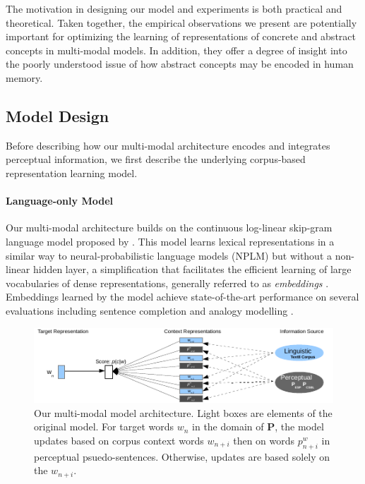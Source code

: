The motivation in designing our model and experiments is both practical and theoretical. Taken together, the empirical observations we present are potentially important for optimizing the learning of representations of concrete and abstract concepts in multi-modal models. In addition, they offer a degree of insight into the poorly understood issue of how abstract concepts may be encoded in human memory.    

\subsection{Model Design}

Before describing how our multi-modal architecture encodes and integrates perceptual information, we first describe the underlying corpus-based representation learning model. 

\paragraph{Language-only Model} Our multi-modal architecture builds on the continuous log-linear skip-gram language model proposed by \cite{mikolov2013efficient}. This model learns lexical representations in a similar way to neural-probabilistic language models (NPLM) but without a non-linear hidden layer, a simplification that facilitates the efficient learning of large vocabularies of dense representations, generally referred to as \emph{embeddings} \cite{turian2010word}. Embeddings learned by the model achieve state-of-the-art performance on several evaluations including sentence completion and analogy modelling \cite{mikolov2013efficient}.   

\begin{figure}[ht]  \includegraphics[width = \textwidth]{Chapter_3/Figure_1_EMNLP2014}  \caption{Our multi-modal model architecture. Light boxes are elements of the original \cite{mikolov2013efficient} model. For target words \(w_n\) in the domain of \(\mathbf{P}\), the model updates based on corpus context words \( w_{n+i} \) then on words \(p^w_{n+i}\) in perceptual psuedo-sentences. Otherwise, updates are based solely on the \( w_{n+i}. \)}\end{figure}

